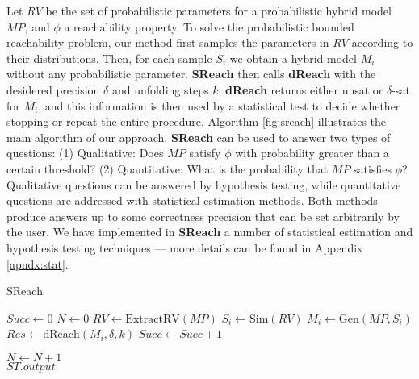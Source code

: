 Let $RV$ be the set of probabilistic parameters for a probabilistic hybrid model $MP$, and $\phi$ a reachability
property. To solve the 
probabilistic bounded reachability problem, our method first samples the parameters in $RV$ according 
to their distributions. Then, for each sample $S_i$ we obtain a hybrid model $M_i$ without any probabilistic 
parameter. {\bf SReach} then calls {\bf dReach} \cite{gaodelta} with the desidered precision $\delta$ and 
unfolding steps $k$. {\bf dReach} returns either unsat or $\delta$-sat for $M_i$, and this information
is then used by a statistical test to decide whether stopping or repeat the entire procedure.
Algorithm \ref{fig:sreach} illustrates the main algorithm of our approach.
{\bf SReach} can be used to answer two types of questions: (1) Qualitative: Does $MP$ satisfy $\phi$ with probability
greater than a certain threshold? (2) Quantitative: What is the probability that $MP$ satisfies $\phi$?
Qualitative questions can be answered by hypothesis testing, while quantitative questions are addressed with
statistical estimation methods. Both methods produce answers up to some correctness 
precision that can be set arbitrarily by the user.
We have implemented in {\bf SReach} a number of statistical estimation and hypothesis testing techniques ---
more details can be found in Appendix \ref{apndx:stat}.

 

\begin{algorithm}
  \centering
  \caption{SReach}
  \label{fig:sreach}
  \begin{algorithmic}[1]
        \State $Succ \gets 0$	
        \State $N \gets 0$	
        \State $RV \gets \mathrm{ExtractRV}(MP)$	
        \Repeat
            \State $S_i \gets \mathrm{Sim}(RV)$		
            \State $M_i \gets \mathrm{Gen}(MP, S_i)$	
            \State $Res \gets \mathrm{dReach}(M_i, \delta, k)$	
		\State $Succ \gets Succ + 1$
	    
	  \EndIf
	\State $N \gets N + 1$
        	\\
	\quad\hspace{0.5ex} \Return $ST.output$
   \EndFunction
  \end{algorithmic}
\end{algorithm}

